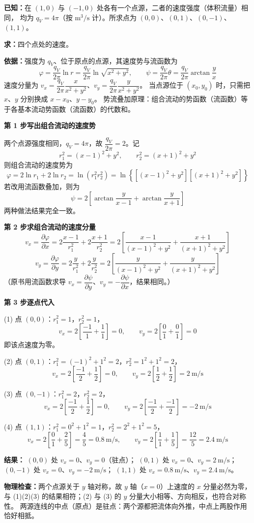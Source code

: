\begin{jie}
\textbf{已知：}在 $(1,0)$ 与 $(-1,0)$ 处各有一个点源，二者的速度强度（体积流量）相同，
均为 $q_V=4\pi$（按 $\mathrm{m^3/s}$ 计）。所求点为 $(0,0)$、$(0,1)$、$(0,-1)$、$(1,1)$。

\textbf{求：}四个点处的速度。

\textbf{依据：}强度为 $q_V$、位于原点的点源，其速度势与流函数为
\[ \varphi=\frac{q_V}{2\pi}\ln r=\frac{q_V}{2\pi}\ln\sqrt{x^2+y^2},\qquad
   \psi=\frac{q_V}{2\pi}\theta=\frac{q_V}{2\pi}\arctan\frac{y}{x} \]
速度分量为 $v_x=\dfrac{q_V}{2\pi}\dfrac{x}{x^2+y^2}$、$v_y=\dfrac{q_V}{2\pi}\dfrac{y}{x^2+y^2}$。
当点源位于 $(x_0,y_0)$ 时，只需把 $x$、$y$ 分别换成 $x-x_0$、$y-y_0$。
势流叠加原理：组合流动的势函数（流函数）等于各基本流动势函数（流函数）的代数和。

\textbf{第 1 步\quad 写出组合流动的速度势}

两个点源强度相同，$q_V=4\pi$，故 $\dfrac{q_V}{2\pi}=2$。记
\[ r_1^2=(x-1)^2+y^2,\qquad r_2^2=(x+1)^2+y^2 \]
则组合流动的速度势为
\[ \varphi=2\ln r_1+2\ln r_2=\ln\left(r_1^2r_2^2\right)=\ln\left\{\left[(x-1)^2+y^2\right]\left[(x+1)^2+y^2\right]\right\} \]
若改用流函数叠加，则为
\[ \psi=2\left[\arctan\frac{y}{x-1}+\arctan\frac{y}{x+1}\right] \]
两种做法结果完全一致。

\textbf{第 2 步\quad 求组合流动的速度分量}
\[ v_x=\frac{\partial\varphi}{\partial x}=2\frac{x-1}{r_1^2}+2\frac{x+1}{r_2^2}
 =2\left[\frac{x-1}{(x-1)^2+y^2}+\frac{x+1}{(x+1)^2+y^2}\right] \]
\[ v_y=\frac{\partial\varphi}{\partial y}=2\frac{y}{r_1^2}+2\frac{y}{r_2^2}
 =2\left[\frac{y}{(x-1)^2+y^2}+\frac{y}{(x+1)^2+y^2}\right] \]
（原书用流函数求导 $v_x=\dfrac{\partial\psi}{\partial y}$、$v_y=-\dfrac{\partial\psi}{\partial x}$，结果相同。）

\textbf{第 3 步\quad 逐点代入}

\noindent(1) 点 $(0,0)$：$r_1^2=1$，$r_2^2=1$，
\[ v_x=2\left[\frac{-1}{1}+\frac{1}{1}\right]=0,\qquad v_y=2\left[\frac{0}{1}+\frac{0}{1}\right]=0 \]
即该点速度为零。

\noindent(2) 点 $(0,1)$：$r_1^2=(-1)^2+1^2=2$，$r_2^2=1^2+1^2=2$，
\[ v_x=2\left[\frac{-1}{2}+\frac{1}{2}\right]=0,\qquad
   v_y=2\left[\frac{1}{2}+\frac{1}{2}\right]=2\ \mathrm{m/s} \]

\noindent(3) 点 $(0,-1)$：$r_1^2=2$，$r_2^2=2$，
\[ v_x=2\left[\frac{-1}{2}+\frac{1}{2}\right]=0,\qquad
   v_y=2\left[\frac{-1}{2}+\frac{-1}{2}\right]=-2\ \mathrm{m/s} \]

\noindent(4) 点 $(1,1)$：$r_1^2=0^2+1^2=1$，$r_2^2=2^2+1^2=5$，
\[ v_x=2\left[\frac{0}{1}+\frac{2}{5}\right]=\frac{4}{5}=0.8\ \mathrm{m/s},\qquad
   v_y=2\left[\frac{1}{1}+\frac{1}{5}\right]=\frac{12}{5}=2.4\ \mathrm{m/s} \]

\textbf{结果：}
$(0,0)$ 处 $v_x=0$、$v_y=0$（驻点）；
$(0,1)$ 处 $v_x=0$、$v_y=2\ \mathrm{m/s}$；
$(0,-1)$ 处 $v_x=0$、$v_y=-2\ \mathrm{m/s}$；
$(1,1)$ 处 $v_x=0.8\ \mathrm{m/s}$、$v_y=2.4\ \mathrm{m/s}$。

\textbf{物理检查：}两个点源关于 $y$ 轴对称，故 $y$ 轴（$x=0$）上速度的 $x$ 分量必然为零，
与 (1)(2)(3) 的结果相符；(2) 与 (3) 的 $y$ 分量大小相等、方向相反，也符合对称性。
两源连线的中点（原点）是驻点：两个源都把流体向外推，中点上两股作用恰好相抵。
\end{jie}

